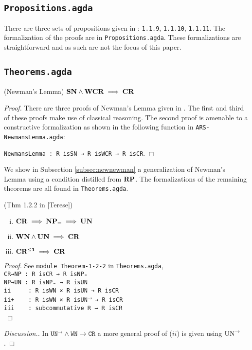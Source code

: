 \subsection{\texttt{Propositions.agda}}
There are three sets of propositions given in \terese: \texttt{1.1.9}, \texttt{1.1.10}, \texttt{1.1.11}.
The formalization of the proofs are in \texttt{Propositions.agda}. These formalizations are straightforward
and as such are not the focus of this paper.

\subsection{\texttt{Theorems.agda}} \label{subsec:theorems}

\begin{theorem}(Newman's Lemma)
  $\mathbf{SN} \land \mathbf{WCR} \implies \mathbf{CR}$
\end{theorem}

\begin{proof}
  There are three proofs of Newman's Lemma given in \terese.
  The first and third of these proofs make use of classical reasoning. The second proof is amenable to a
  constructive formalization as shown in the following function in \texttt{ARS-NewmansLemma.agda}:

  \verb|NewmansLemma : R isSN → R isWCR → R isCR|.
\end{proof}

  We show in Subsection \ref{subsec:newnewman} a generalization of Newman's Lemma using a condition distilled from $\mathbf{RP}$.
  The formalizations of the remaining theorems are all found in \texttt{Theorems.agda}.

\begin{theorem}(Thm 1.2.2 in [Terese])
\begin{enumerate}[(i)]
  \item $\mathbf{CR} \implies \mathbf{NP_=} \implies \mathbf{UN}$
  \item $\mathbf{WN} \land \mathbf{UN} \implies \mathbf{CR}$
  \item $\mathbf{CR^{\le 1}} \implies \mathbf{CR}$
\end{enumerate}
\end{theorem}

\begin{proof}
    See \texttt{module Theorem-1-2-2} in \texttt{Theorems.agda}, \\
    \verb|CR→NP : R isCR → R isNP₌|\\
    \verb|NP→UN : R isNP₌ → R isUN|\\
    \verb|ii     : R isWN × R isUN → R isCR|\\
    \verb|ii+    : R isWN × R |\texttt{isUN}$^{\to}$ \verb|→ R isCR|\\
    \verb|iii    : subcommutative R → R isCR|\\
\end{proof}
\begin{proof}[Discussion.]
    In $\mathtt{UN^{→}∧WN→CR}$ a more general proof of ($ii$) is given using $\mathrm{UN}^{\to}$.
\end{proof}


